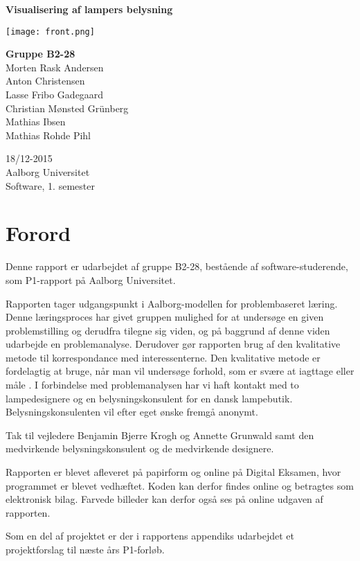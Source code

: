 \begin{titlepage}
  \vspace{0.2cm}
  \begin{center}
    \Huge{\textbf{Visualisering af lampers belysning}}
  \end{center}
  \vspace{0.2cm}
  \vfill
  \begin{center}
  \texttt{[image: front.png]}
  \end{center}
  \begin{center}
    \Large{\textbf{Gruppe B2-28}}\\
	Morten Rask Andersen\\
	Anton Christensen\\
	Lasse Fribo Gadegaard\\
	Christian Mønsted Grünberg\\
	Mathias Ibsen\\
	Mathias Rohde Pihl
  \end{center}
  \begin{center}
 	18/12-2015\\
    Aalborg Universitet\\
    Software, 1. semester
  \end{center}
\end{titlepage}



\addtocounter{page}{-1}
\clearpage



\clearpage


\section{Forord}
Denne rapport er udarbejdet af gruppe B2-28, bestående af software-studerende, som P1-rapport på Aalborg Universitet.

Rapporten tager udgangspunkt i Aalborg-modellen for problembaseret læring. Denne læringsproces har givet gruppen mulighed for at undersøge en given problemstilling og derudfra tilegne sig viden, og på baggrund af denne viden udarbejde en problemanalyse. Derudover gør rapporten brug af den kvalitative metode til korrespondance med interessenterne. Den kvalitative metode er fordelagtig at bruge, når man vil undersøge forhold, som er svære at iagttage eller måle \cite{kvalitativ_metode}. I forbindelse med problemanalysen har vi haft kontakt med to lampedesignere og en belysningskonsulent for en dansk lampebutik. Belysningskonsulenten vil efter eget ønske fremgå anonymt. 

Tak til vejledere Benjamin Bjerre Krogh og Annette Grunwald samt den medvirkende belysningskonsulent og de medvirkende designere.

Rapporten er blevet afleveret på papirform og online på Digital Eksamen, hvor programmet er blevet vedhæftet. Koden kan derfor findes online og betragtes som elektronisk bilag. Farvede billeder kan derfor også ses på online udgaven af rapporten. 

Som en del af projektet er der i rapportens appendiks udarbejdet et projektforslag til næste års P1-forløb.
\clearpage

\clearpage